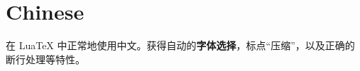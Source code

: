 \documentclass{article}
\begin{document}
\section{Chinese}

在 Lua\TeX{} 中正常地使用中文。获得自动的\textbf{字体选择}，标点“压缩”，以及正确的断行处理等特性。
\end{document}
